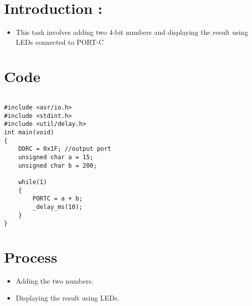 \begin{center}
    \fbox{\Large{\textbf{\textcolor{red}{4-bit Addition}}}}
\end{center}
\section*{Introduction :}
\begin{itemize}
    \item This task involves adding two 4-bit numbers and displaying
			the result using LEDs connected to PORT-C
\end{itemize}

\section*{Code}

{\renewcommand\fcolorbox[4][]{\textcolor{cyan}{\strut#4}}
        \begin{verbatim}

#include <avr/io.h>
#include <stdint.h>
#include <util/delay.h>
int main(void)
{
	DDRC = 0x1F; //output port
	unsigned char a = 15;
	unsigned char b = 200;
	
	while(1)
	{
		PORTC = a + b;
		_delay_ms(10);
	}
}

        \end{verbatim}
}

\section*{Process}
\begin{itemize}
    \item Adding the two numbers.
    \item Displaying the result using LEDs.
\end{itemize}
